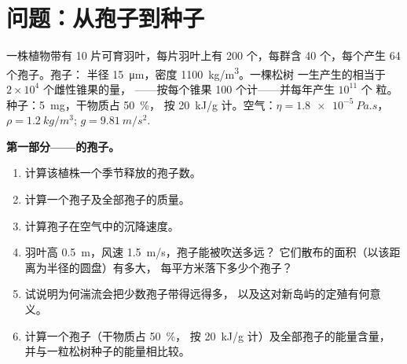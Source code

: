 \section{问题：从孢子到种子}

\begin{problem}
\label{pb:b2:plant-life-cycles:1}
一株植物带有 \num{10} 片可育羽叶，每片羽叶上有 \num{200}
个，每群含 \num{40} 个，每个产生 \num{64} 个孢子。孢子：
半径 \qty{15}{\micro m}，密度 \qty{1100}{kg/m^3}。一棵松树
一生产生的相当于 $2\times 10^{4}$ 个雌性锥果的量，
——按每个锥果 \num{100} 个计——并每年产生 $10^{11}$ 个
粒。种子：\qty{5}{mg}，干物质占 \qty{50}{\%}，
按 \qty{20}{kJ/g} 计。空气：$\eta = \qty{1.8e-5}{Pa.s}$，$\rho =
\qty{1.2}{kg/m^3}$; $g = \qty{9.81}{m/s^2}$.

\medskip
\noindent\textbf{第一部分——的孢子。}
\begin{enumerate}
  \item 计算该植株一个季节释放的孢子数。
  \item 计算一个孢子及全部孢子的质量。
  \item 计算孢子在空气中的沉降速度。
  \item 羽叶高 \qty{0.5}{m}，风速 \qty{1.5}{m/s}，孢子能被吹送多远？
        它们散布的面积（以该距离为半径的圆盘）有多大，
        每平方米落下多少个孢子？
  \item 试说明为何湍流会把少数孢子带得远得多，
        以及这对新岛屿的定殖有何意义。
  \item 计算一个孢子（干物质占 \qty{50}{\%}，
        按 \qty{20}{kJ/g} 计）及全部孢子的能量含量，
        并与一粒松树种子的能量相比较。
\end{enumerate}


\end{problem}
